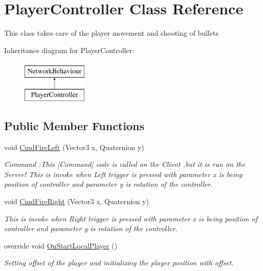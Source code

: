 \hypertarget{class_player_controller}{}\section{Player\+Controller Class Reference}
\label{class_player_controller}


This class takes care of the player movement and shooting of bullets  


Inheritance diagram for Player\+Controller\+:\begin{figure}[H]
\begin{center}
\leavevmode
\includegraphics[height=2.000000cm]{class_player_controller}
\end{center}
\end{figure}
\subsection*{Public Member Functions}
\begin{DoxyCompactItemize}
\item 
void \mbox{\hyperlink{class_player_controller_addacb48b01966c18cc42ffddbabb781f}{Cmd\+Fire\+Left}} (Vector3 x, Quaternion y)
\begin{DoxyCompactList}\small\item\em Command \+:This \mbox{[}Command\mbox{]} code is called on the Client ,but it is run on the Server! This is invoke when Left trigger is pressed with parameter x is being position of controller and parameter y is rotation of the controller. \end{DoxyCompactList}\item 
void \mbox{\hyperlink{class_player_controller_af9d10173a13edf187e48ee031d1046c8}{Cmd\+Fire\+Right}} (Vector3 x, Quaternion y)
\begin{DoxyCompactList}\small\item\em This is invoke when Right trigger is pressed with parameter x is being position of controller and parameter y is rotation of the controller. \end{DoxyCompactList}\item 
override void \mbox{\hyperlink{class_player_controller_aa274be913417ca85d0cf5fc0afd93696}{On\+Start\+Local\+Player}} ()
\begin{DoxyCompactList}\small\item\em Setting offset of the player and initializing the player position with offset. \end{DoxyCompactList}\end{DoxyCompactItemize}

